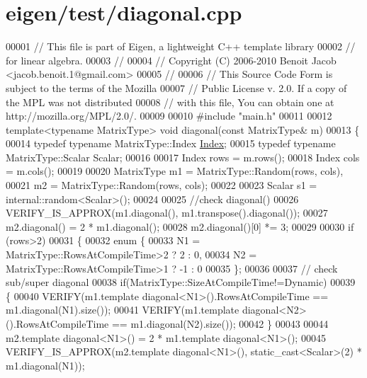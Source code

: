 \hypertarget{eigen_2test_2diagonal_8cpp_source}{}\section{eigen/test/diagonal.cpp}
\label{eigen_2test_2diagonal_8cpp_source}

\begin{DoxyCode}
00001 \textcolor{comment}{// This file is part of Eigen, a lightweight C++ template library}
00002 \textcolor{comment}{// for linear algebra.}
00003 \textcolor{comment}{//}
00004 \textcolor{comment}{// Copyright (C) 2006-2010 Benoit Jacob <jacob.benoit.1@gmail.com>}
00005 \textcolor{comment}{//}
00006 \textcolor{comment}{// This Source Code Form is subject to the terms of the Mozilla}
00007 \textcolor{comment}{// Public License v. 2.0. If a copy of the MPL was not distributed}
00008 \textcolor{comment}{// with this file, You can obtain one at http://mozilla.org/MPL/2.0/.}
00009 
00010 \textcolor{preprocessor}{#include "main.h"}
00011 
00012 \textcolor{keyword}{template}<\textcolor{keyword}{typename} MatrixType> \textcolor{keywordtype}{void} diagonal(\textcolor{keyword}{const} MatrixType& m)
00013 \{
00014   \textcolor{keyword}{typedef} \textcolor{keyword}{typename} MatrixType::Index \hyperlink{namespace_eigen_a62e77e0933482dafde8fe197d9a2cfde}{Index};
00015   \textcolor{keyword}{typedef} \textcolor{keyword}{typename} MatrixType::Scalar Scalar;
00016 
00017   Index rows = m.rows();
00018   Index cols = m.cols();
00019 
00020   MatrixType m1 = MatrixType::Random(rows, cols),
00021              m2 = MatrixType::Random(rows, cols);
00022 
00023   Scalar s1 = internal::random<Scalar>();
00024 
00025   \textcolor{comment}{//check diagonal()}
00026   VERIFY\_IS\_APPROX(m1.diagonal(), m1.transpose().diagonal());
00027   m2.diagonal() = 2 * m1.diagonal();
00028   m2.diagonal()[0] *= 3;
00029 
00030   \textcolor{keywordflow}{if} (rows>2)
00031   \{
00032     \textcolor{keyword}{enum} \{
00033       N1 = MatrixType::RowsAtCompileTime>2 ?  2 : 0,
00034       N2 = MatrixType::RowsAtCompileTime>1 ? -1 : 0
00035     \};
00036 
00037     \textcolor{comment}{// check sub/super diagonal}
00038     \textcolor{keywordflow}{if}(MatrixType::SizeAtCompileTime!=Dynamic)
00039     \{
00040       VERIFY(m1.template diagonal<N1>().RowsAtCompileTime == m1.diagonal(N1).size());
00041       VERIFY(m1.template diagonal<N2>().RowsAtCompileTime == m1.diagonal(N2).size());
00042     \}
00043 
00044     m2.template diagonal<N1>() = 2 * m1.template diagonal<N1>();
00045     VERIFY\_IS\_APPROX(m2.template diagonal<N1>(), static\_cast<Scalar>(2) * m1.diagonal(N1));

\end{DoxyCode}
